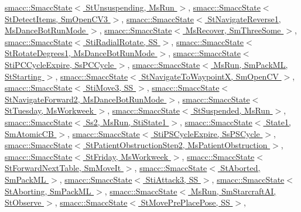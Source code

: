 \hyperlink{classsmacc_1_1SmaccState_afc39f8e0ca4001b2159a100da2fccd0e}{smacc\+::\+Smacc\+State$<$ St\+Unsuspending, Ms\+Run $>$}, \hyperlink{classsmacc_1_1SmaccState_afc39f8e0ca4001b2159a100da2fccd0e}{smacc\+::\+Smacc\+State$<$ St\+Detect\+Items, Sm\+Open\+C\+V3 $>$}, \hyperlink{classsmacc_1_1SmaccState_afc39f8e0ca4001b2159a100da2fccd0e}{smacc\+::\+Smacc\+State$<$ St\+Navigate\+Reverse1, Ms\+Dance\+Bot\+Run\+Mode $>$}, \hyperlink{classsmacc_1_1SmaccState_afc39f8e0ca4001b2159a100da2fccd0e}{smacc\+::\+Smacc\+State$<$ Ms\+Recover, Sm\+Three\+Some $>$}, \hyperlink{classsmacc_1_1SmaccState_afc39f8e0ca4001b2159a100da2fccd0e}{smacc\+::\+Smacc\+State$<$ Sti\+Radial\+Rotate, S\+S $>$}, \hyperlink{classsmacc_1_1SmaccState_afc39f8e0ca4001b2159a100da2fccd0e}{smacc\+::\+Smacc\+State$<$ St\+Rotate\+Degrees1, Ms\+Dance\+Bot\+Run\+Mode $>$}, \hyperlink{classsmacc_1_1SmaccState_afc39f8e0ca4001b2159a100da2fccd0e}{smacc\+::\+Smacc\+State$<$ Sti\+P\+C\+Cycle\+Expire, Ss\+P\+C\+Cycle $>$}, \hyperlink{classsmacc_1_1SmaccState_afc39f8e0ca4001b2159a100da2fccd0e}{smacc\+::\+Smacc\+State$<$ Ms\+Run, Sm\+Pack\+M\+L, St\+Starting $>$}, \hyperlink{classsmacc_1_1SmaccState_afc39f8e0ca4001b2159a100da2fccd0e}{smacc\+::\+Smacc\+State$<$ St\+Navigate\+To\+Waypoint\+X, Sm\+Open\+C\+V $>$}, \hyperlink{classsmacc_1_1SmaccState_afc39f8e0ca4001b2159a100da2fccd0e}{smacc\+::\+Smacc\+State$<$ Sti\+Move3, S\+S $>$}, \hyperlink{classsmacc_1_1SmaccState_afc39f8e0ca4001b2159a100da2fccd0e}{smacc\+::\+Smacc\+State$<$ St\+Navigate\+Forward2, Ms\+Dance\+Bot\+Run\+Mode $>$}, \hyperlink{classsmacc_1_1SmaccState_afc39f8e0ca4001b2159a100da2fccd0e}{smacc\+::\+Smacc\+State$<$ St\+Tuesday, Ms\+Workweek $>$}, \hyperlink{classsmacc_1_1SmaccState_afc39f8e0ca4001b2159a100da2fccd0e}{smacc\+::\+Smacc\+State$<$ St\+Suspended, Ms\+Run $>$}, \hyperlink{classsmacc_1_1SmaccState_afc39f8e0ca4001b2159a100da2fccd0e}{smacc\+::\+Smacc\+State$<$ Ss2, Ms\+Run, Sti\+State1 $>$}, \hyperlink{classsmacc_1_1SmaccState_afc39f8e0ca4001b2159a100da2fccd0e}{smacc\+::\+Smacc\+State$<$ State1, Sm\+Atomic\+C\+B $>$}, \hyperlink{classsmacc_1_1SmaccState_afc39f8e0ca4001b2159a100da2fccd0e}{smacc\+::\+Smacc\+State$<$ Sti\+P\+S\+Cycle\+Expire, Ss\+P\+S\+Cycle $>$}, \hyperlink{classsmacc_1_1SmaccState_afc39f8e0ca4001b2159a100da2fccd0e}{smacc\+::\+Smacc\+State$<$ St\+Patient\+Obstruction\+Step2, Ms\+Patient\+Obstruction $>$}, \hyperlink{classsmacc_1_1SmaccState_afc39f8e0ca4001b2159a100da2fccd0e}{smacc\+::\+Smacc\+State$<$ St\+Friday, Ms\+Workweek $>$}, \hyperlink{classsmacc_1_1SmaccState_afc39f8e0ca4001b2159a100da2fccd0e}{smacc\+::\+Smacc\+State$<$ St\+Forward\+Next\+Table, Sm\+Move\+It $>$}, \hyperlink{classsmacc_1_1SmaccState_afc39f8e0ca4001b2159a100da2fccd0e}{smacc\+::\+Smacc\+State$<$ St\+Aborted, Sm\+Pack\+M\+L $>$}, \hyperlink{classsmacc_1_1SmaccState_afc39f8e0ca4001b2159a100da2fccd0e}{smacc\+::\+Smacc\+State$<$ Sti\+Attack3, S\+S $>$}, \hyperlink{classsmacc_1_1SmaccState_afc39f8e0ca4001b2159a100da2fccd0e}{smacc\+::\+Smacc\+State$<$ St\+Aborting, Sm\+Pack\+M\+L $>$}, \hyperlink{classsmacc_1_1SmaccState_afc39f8e0ca4001b2159a100da2fccd0e}{smacc\+::\+Smacc\+State$<$ Ms\+Run, Sm\+Starcraft\+A\+I, St\+Observe $>$}, \hyperlink{classsmacc_1_1SmaccState_afc39f8e0ca4001b2159a100da2fccd0e}{smacc\+::\+Smacc\+State$<$ St\+Move\+Pre\+Place\+Pose, S\+S $>$}, 